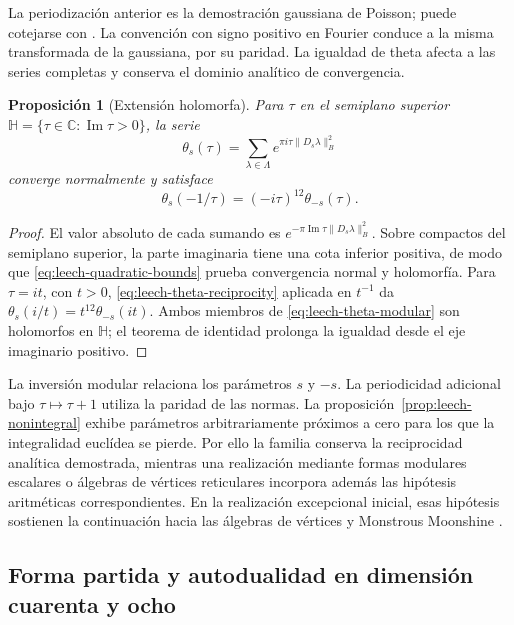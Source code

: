 \documentclass[a4paper,10pt]{article}
\newtheorem{proposition}[theorem]{Proposición}
\theoremstyle{definition}\newtheorem{definition}[theorem]{Definición}
\theoremstyle{remark}\newtheorem{remark}[theorem]{Observación}
\numberwithin{equation}{section}
\begin{document}
La periodización anterior es la demostración gaussiana de Poisson;
puede cotejarse con \cite[teorema 2, pp.~10--11]{Elkies}.
La convención con signo positivo en Fourier conduce a la misma
transformada de la gaussiana, por su paridad. La igualdad de theta
afecta a las series completas y conserva el dominio analítico de
convergencia.

\begin{proposition}[Extensión holomorfa]
\label{prop:leech-theta-complex}
Para \(\tau\) en el semiplano superior
\(\mathbb H=\{\tau\in\mathbb C:\operatorname{Im}\tau>0\}\), la serie
\begin{equation}
 \theta_s(\tau)=\sum_{\lambda\in\Lambda}
             e^{\pi i\tau\|D_s\lambda\|_B^2}
 \label{eq:leech-theta-complex}
\end{equation}
converge normalmente y satisface
\begin{equation}
 \theta_s(-1/\tau)=(-i\tau)^{12}\theta_{-s}(\tau).
 \label{eq:leech-theta-modular}
\end{equation}
\end{proposition}
\begin{proof}
El valor absoluto de cada sumando es
\(e^{-\pi\operatorname{Im}\tau\|D_s\lambda\|_B^2}\).
Sobre compactos del semiplano superior, la parte imaginaria tiene
una cota inferior positiva, de modo que
\eqref{eq:leech-quadratic-bounds} prueba convergencia normal y
holomorfía. Para \(\tau=it\), con \(t>0\),
\eqref{eq:leech-theta-reciprocity} aplicada en \(t^{-1}\) da
\(\theta_s(i/t)=t^{12}\theta_{-s}(it)\).
Ambos miembros de \eqref{eq:leech-theta-modular} son holomorfos
en \(\mathbb H\); el teorema de identidad prolonga la igualdad
desde el eje imaginario positivo.
\end{proof}

La inversión modular relaciona los parámetros \(s\) y \(-s\).
La periodicidad adicional bajo \(\tau\mapsto\tau+1\) utiliza la
paridad de las normas. La proposición~\ref{prop:leech-nonintegral}
exhibe parámetros arbitrariamente próximos a cero para los que
la integralidad euclídea se pierde. Por ello la familia conserva
la reciprocidad analítica demostrada, mientras una realización
mediante formas modulares escalares o álgebras de vértices
reticulares incorpora además las hipótesis aritméticas
correspondientes. En la realización excepcional inicial, esas
hipótesis sostienen la continuación hacia las álgebras de vértices
y Monstrous Moonshine \cite{HMT-IV}.

\subsection{Forma partida y autodualidad en dimensión cuarenta y ocho}
\label{subsec:leech-split}
\end{document}
